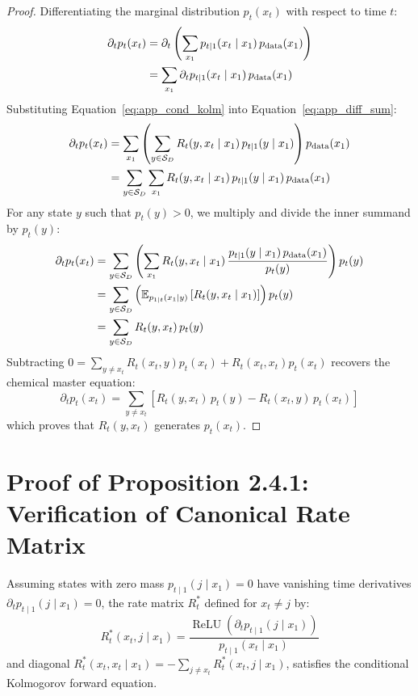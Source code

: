 \begin{proof}
Differentiating the marginal distribution $p_t(x_t)$ with respect to time $t$:
\begin{align}
\partial_t p_t(x_t) &= \partial_t \left( \sum_{x_1} p_{t \mid 1}(x_t \mid x_1) \, p_{\text{data}}(x_1) \right) \notag \\
&= \sum_{x_1} \partial_t p_{t \mid 1}(x_t \mid x_1) \, p_{\text{data}}(x_1) \label{eq:app_diff_sum}
\end{align}
Substituting Equation~\ref{eq:app_cond_kolm} into Equation~\ref{eq:app_diff_sum}:
\begin{align}
\partial_t p_t(x_t) &= \sum_{x_1} \left( \sum_{y \in \mathcal{S}_D} R_t(y, x_t \mid x_1) \, p_{t \mid 1}(y \mid x_1) \right) p_{\text{data}}(x_1) \notag \\
&= \sum_{y \in \mathcal{S}_D} \sum_{x_1} R_t(y, x_t \mid x_1) \, p_{t \mid 1}(y \mid x_1) \, p_{\text{data}}(x_1) \label{eq:app_exchange_sums}
\end{align}
For any state $y$ such that $p_t(y) > 0$, we multiply and divide the inner summand by $p_t(y)$:
\begin{align}
\partial_t p_t(x_t) &= \sum_{y \in \mathcal{S}_D} \left( \sum_{x_1} R_t(y, x_t \mid x_1) \, \frac{p_{t \mid 1}(y \mid x_1) \, p_{\text{data}}(x_1)}{p_t(y)} \right) p_t(y) \notag \\
&= \sum_{y \in \mathcal{S}_D} \left( \mathbb{E}_{p_{1 \mid t}(x_1 \mid y)} \left[ R_t(y, x_t \mid x_1) \right] \right) p_t(y) \notag \\
&= \sum_{y \in \mathcal{S}_D} R_t(y, x_t) \, p_t(y) \label{eq:app_final_kolm}
\end{align}
Subtracting $0 = \sum_{y \ne x_t} R_t(x_t, y) p_t(x_t) + R_t(x_t, x_t) p_t(x_t)$ recovers the chemical master equation:
\begin{equation}
\partial_t p_t(x_t) = \sum_{y \ne x_t} \left[ R_t(y, x_t) \, p_t(y) - R_t(x_t, y) \, p_t(x_t) \right]
\end{equation}
which proves that $R_t(y, x_t)$ generates $p_t(x_t)$.
\end{proof}

\section{Proof of Proposition 2.4.1: Verification of Canonical Rate Matrix}

\begin{pro}
Assuming states with zero mass $p_{t \mid 1}(j \mid x_1) = 0$ have vanishing time derivatives $\partial_t p_{t \mid 1}(j \mid x_1) = 0$, the rate matrix $R_t^*$ defined for $x_t \ne j$ by:
\begin{equation}
R_t^*(x_t, j \mid x_1) = \frac{\operatorname{ReLU}\left( \partial_t p_{t \mid 1}(j \mid x_1) \right)}{p_{t \mid 1}(x_t \mid x_1)}
\label{eq:app_canonical_rate}
\end{equation}
and diagonal $R_t^*(x_t, x_t \mid x_1) = - \sum_{j \ne x_t} R_t^*(x_t, j \mid x_1)$, satisfies the conditional Kolmogorov forward equation.
\end{pro}

